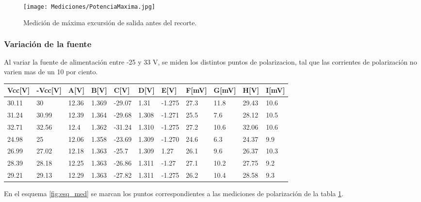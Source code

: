 		\begin{figure}[h!]
			\centering
			\texttt{[image: Mediciones/PotenciaMaxima.jpg]}
			\caption{Medición de máxima excursión de salida antes del recorte.}
			\label{fig:MaxExcur}
		\end{figure}

		\subsubsection{Variación de la fuente}
		Al variar la fuente de alimentación entre -25 y 33 V, se miden los distintos puntos de polarizacion, tal que las corrientes de polarización no varien mas de un 10 por ciento.
		\begin{table}[]
		\begin{tabular}{|l|l|l|l|l|l|l|l|l|l|l|}
		\hline
		Vcc{[}V{]} & -Vcc{[}V{]} & A{[}V{]} & B{[}V{]} & C{[}V{]} & D{[}V{]} & E{[}V{]} & F{[}mV{]} & G{[}mV{]} & H{[}V{]} & I{[}mV{]} \\ \hline
		30.11      & 30          & 12.36    & 1.369    & -29.07   & 1.31     & -1.275   & 27.3      & 11.8      & 29.43    & 10.6      \\ \hline
		31.24      & 30.99       & 12.39    & 1.364    & -29.68   & 1.308    & -1.271   & 25.5      & 7.6       & 28.12    & 10.5      \\ \hline
		32.71      & 32.56       & 12.4     & 1.362    & -31.24   & 1.310    & -1.275   & 27.2      & 10.6      & 32.06    & 10.6      \\ \hline
		24.98      & 25          & 12.06    & 1.358    & -23.69   & 1.309    & -1.270   & 24.6      & 6.3       & 24.37    & 9.9       \\ \hline
		26.99      & 27.02       & 12.18    & 1.363    & -25.7    & 1.309    & 1.27     & 26.1      & 9.6       & 26.37    & 10.3      \\ \hline
		28.39      & 28.18       & 12.25    & 1.363    & -26.86   & 1.311    & -1.27    & 27.1      & 10.2      & 27.75    & 9.2       \\ \hline
		29.21      & 29.13       & 12.29    & 1.363    & -27.82   & 1.311    & -1.275   & 26.2      & 10.4      & 28.58    & 9.3       \\ \hline
		\end{tabular}
		\label{tab.valores}
		\end{table}

		En el esquema \ref{fig:esq_med} se marcan los puntos correspondientes a las mediciones de polarización de la tabla \ref{tab.valores}.

